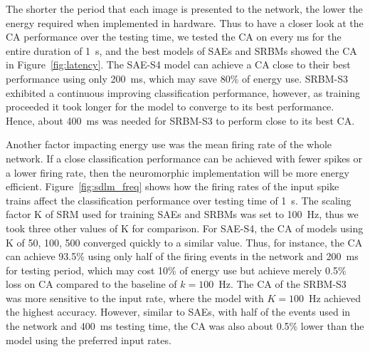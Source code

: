 The shorter the period that each image is presented to the network, the lower the energy required when implemented in hardware.
Thus to have a closer look at the CA performance over the testing time, we tested the CA on every ms for the entire duration of 1~s, and the best models of SAEs and SRBMs showed the CA in Figure~\ref{fig:latency}.
The SAE-S4 model can achieve a CA close to their best performance using only 200~ms, which may save 80\% of energy use.
SRBM-S3 exhibited a continuous improving classification performance, however, as training proceeded it took longer for the model to converge to its best performance.
Hence, about 400~ms was needed for SRBM-S3 to perform close to its best CA.

Another factor impacting energy use was the mean firing rate of the whole network.
If a close classification performance can be achieved with fewer spikes or a lower firing rate, then the neuromorphic implementation will be more energy efficient.
Figure~\ref{fig:sdlm_freq} shows how the firing rates of the input spike trains affect the classification performance over testing time of 1~s.
The scaling factor K of SRM used for training SAEs and SRBMs was set to 100~Hz, thus we took three other values of K for comparison.
For SAE-S4, the CA of models using K of 50, 100, 500 converged quickly to a similar value.
Thus, for instance, the CA can achieve 93.5\% using only half of the firing events in the network and 200~ms for testing period, which may cost 10\% of energy use but achieve merely 0.5\% loss on CA compared to the baseline of $k=100$~Hz.
The CA of the SRBM-S3 was more sensitive to the input rate, where the model with $K=100$~Hz achieved the highest accuracy.
However, similar to SAEs, with half of the events used in the network and 400~ms testing time, the CA was also about 0.5\% lower than the model using the preferred input rates.

